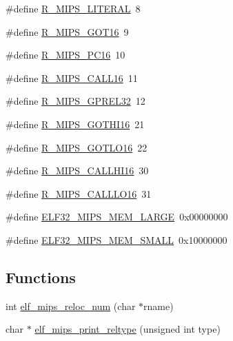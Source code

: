 \begin{DoxyCompactItemize}
\item 
\#define \hyperlink{elf-mips32_8h_a41deedc18c240f1443052301c853c552}{R\-\_\-\-M\-I\-P\-S\-\_\-\-L\-I\-T\-E\-R\-A\-L}~8
\item 
\#define \hyperlink{elf-mips32_8h_ada5f69fe0b77b61f6702b02c68e2aba4}{R\-\_\-\-M\-I\-P\-S\-\_\-\-G\-O\-T16}~9
\item 
\#define \hyperlink{elf-mips32_8h_a6b0e7c0b2a8a65c6888af51f0a9e0b39}{R\-\_\-\-M\-I\-P\-S\-\_\-\-P\-C16}~10
\item 
\#define \hyperlink{elf-mips32_8h_a9aa637d76c26192590f3ce823069bef2}{R\-\_\-\-M\-I\-P\-S\-\_\-\-C\-A\-L\-L16}~11
\item 
\#define \hyperlink{elf-mips32_8h_a55ab8e659a043c6cef30f6c41fed347a}{R\-\_\-\-M\-I\-P\-S\-\_\-\-G\-P\-R\-E\-L32}~12
\item 
\#define \hyperlink{elf-mips32_8h_ada94cefd5996daf20bc2387afc96705e}{R\-\_\-\-M\-I\-P\-S\-\_\-\-G\-O\-T\-H\-I16}~21
\item 
\#define \hyperlink{elf-mips32_8h_aa5167d4d7e7d680ab1d07f2f6446e54c}{R\-\_\-\-M\-I\-P\-S\-\_\-\-G\-O\-T\-L\-O16}~22
\item 
\#define \hyperlink{elf-mips32_8h_a7a540ca0d5ae4b8dc87517a7f2010603}{R\-\_\-\-M\-I\-P\-S\-\_\-\-C\-A\-L\-L\-H\-I16}~30
\item 
\#define \hyperlink{elf-mips32_8h_a02d708957acd24c8e04bf51a10c30c6c}{R\-\_\-\-M\-I\-P\-S\-\_\-\-C\-A\-L\-L\-L\-O16}~31
\item 
\#define \hyperlink{elf-mips32_8h_ab50a6b07a8666d0d9e87ea54dac9c337}{E\-L\-F32\-\_\-\-M\-I\-P\-S\-\_\-\-M\-E\-M\-\_\-\-L\-A\-R\-G\-E}~0x00000000
\item 
\#define \hyperlink{elf-mips32_8h_a426cadc3baf8c47e27a670b1919aba8e}{E\-L\-F32\-\_\-\-M\-I\-P\-S\-\_\-\-M\-E\-M\-\_\-\-S\-M\-A\-L\-L}~0x10000000
\end{DoxyCompactItemize}
\subsection*{Functions}
\begin{DoxyCompactItemize}
\item 
int \hyperlink{elf-mips32_8h_ad1a767da8dcfafa55258fcc9f84321cd}{elf\-\_\-mips\-\_\-reloc\-\_\-num} (char $\ast$rname)
\item 
char $\ast$ \hyperlink{elf-mips32_8h_a79077012a6118cd9916628921510665d}{elf\-\_\-mips\-\_\-print\-\_\-reltype} (unsigned int type)
\end{DoxyCompactItemize}


